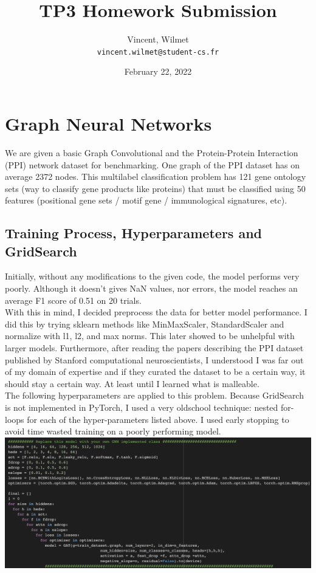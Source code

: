 \documentclass[13pt,english]{article}
\begin{document}
\title{TP3 Homework Submission}
\date{February 22, 2022}

\author{
  Vincent, Wilmet\\
  \texttt{vincent.wilmet@student-cs.fr}
  } 

\maketitle

\section{{Graph Neural Networks}}
We are given a basic Graph Convolutional and the Protein-Protein Interaction (PPI) network dataset for benchmarking. One graph of the PPI dataset has on average 2372 nodes. This multilabel classification problem has 121 gene ontology sets (way to classify gene products like proteins) that must be classified using 50 features (positional gene sets / motif gene / immunological signatures, etc).

\subsection{Training Process, Hyperparameters and GridSearch}
Initially, without any modifications to the given code, the model performs very poorly. Although it doesn't gives NaN values, nor errors, the model reaches an average F1 score of 0.51 on 20 trials. \\

With this in mind, I decided preprocess the data for better model performance. I did this by trying sklearn methods like MinMaxScaler, StandardScaler and normalize with l1, l2, and max norms. This later showed to be unhelpful with larger models. Furthermore, after reading the papers describing the PPI dataset published by Stanford computational neuroscientists, I understood I was far out of my domain of expertise and if they curated the dataset to be a certain way, it should stay a certain way. At least until I learned what is malleable. \\

The following hyperparameters are applied to this problem. Because GridSearch is not implemented in PyTorch, I used a very oldschool technique: nested for-loops for each of the hyper-parameters listed above. I used early stopping to avoid time wasted training on a poorly performing model. \\
\includegraphics[width=\textwidth]{hyperparameters.png} \\
\end{document}
